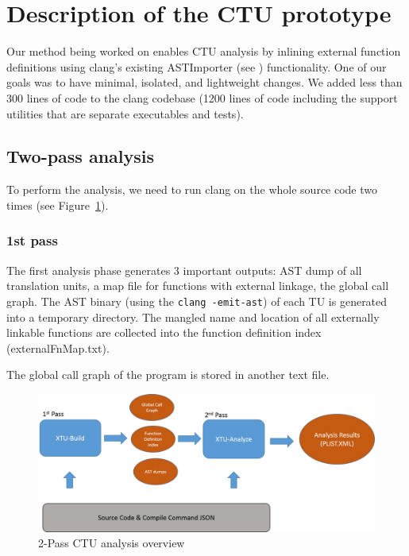 \documentclass{article}
\begin{document}

\section{Description of the CTU prototype}
Our method being worked on enables CTU analysis 
by inlining external function definitions using clang's existing ASTImporter 
(see \cite{astimporter}) functionality.
One of our goals was to have minimal, isolated, and lightweight changes.
We added less than 300 lines of code to the clang codebase 
(1200 lines of code including the support utilities that are 
  separate executables and tests). 

\subsection{Two-pass analysis}
To perform the analysis, we need to run clang on the whole source code two times 
(see Figure~\ref{figctu}).

\subsubsection*{1st pass}
The first analysis phase generates 3 important outputs: AST dump of all
translation units, a map file for functions with external linkage, the global call graph.
The AST binary (using the {\tt clang -emit-ast}) 
of each TU is generated into a temporary directory. 
The mangled name and location of all externally linkable functions 
are collected into the function definition index (externalFnMap.txt). 

The global call graph of the program is stored in another text file.

\begin{figure}[h!]
\includegraphics[width=\textwidth]{images/ctu.png}
\caption{2-Pass CTU analysis overview}
\label{figctu}
\end{figure}
\end{document}
